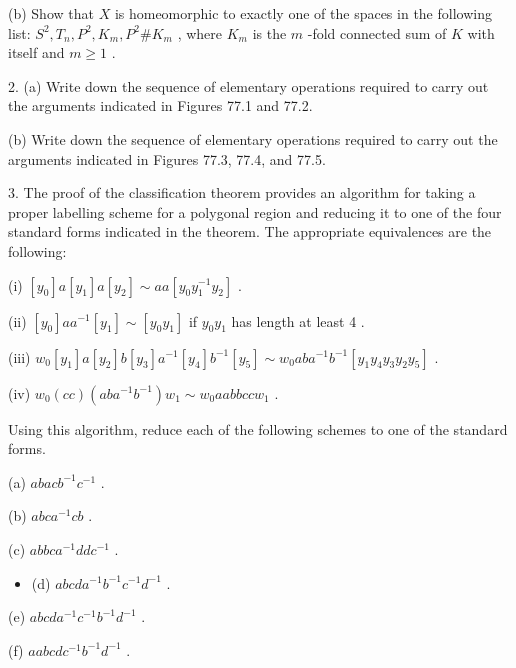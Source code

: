 (b) Show that \(X\) is homeomorphic to exactly one of the spaces in the following list: \({S}^{2},{T}_{n},{P}^{2},{K}_{m},{P}^{2}\# {K}_{m}\) , where \({K}_{m}\) is the \(m\) -fold connected sum of \(K\) with itself and \(m \geq  1\) .

2. (a) Write down the sequence of elementary operations required to carry out the arguments indicated in Figures 77.1 and 77.2.

(b) Write down the sequence of elementary operations required to carry out the arguments indicated in Figures 77.3, 77.4, and 77.5.

3. The proof of the classification theorem provides an algorithm for taking a proper labelling scheme for a polygonal region and reducing it to one of the four standard forms indicated in the theorem. The appropriate equivalences are the following:

(i) \(\left\lbrack  {y}_{0}\right\rbrack  a\left\lbrack  {y}_{1}\right\rbrack  a\left\lbrack  {y}_{2}\right\rbrack \sim  {aa}\left\lbrack  {{y}_{0}{y}_{1}^{-1}{y}_{2}}\right\rbrack\) .

(ii) \(\left\lbrack  {y}_{0}\right\rbrack  a{a}^{-1}\left\lbrack  {y}_{1}\right\rbrack \sim  \left\lbrack  {{y}_{0}{y}_{1}}\right\rbrack\) if \({y}_{0}{y}_{1}\) has length at least 4 .

(iii) \({w}_{0}\left\lbrack  {y}_{1}\right\rbrack  a\left\lbrack  {y}_{2}\right\rbrack  b\left\lbrack  {y}_{3}\right\rbrack  {a}^{-1}\left\lbrack  {y}_{4}\right\rbrack  {b}^{-1}\left\lbrack  {y}_{5}\right\rbrack \sim  {w}_{0}{ab}{a}^{-1}{b}^{-1}\left\lbrack  {{y}_{1}{y}_{4}{y}_{3}{y}_{2}{y}_{5}}\right\rbrack\) .

(iv) \({w}_{0}\left( {cc}\right) \left( {{ab}{a}^{-1}{b}^{-1}}\right) {w}_{1} \sim  {w}_{0}{aabbcc}{w}_{1}\) .

Using this algorithm, reduce each of the following schemes to one of the standard forms.

(a) \({abac}{b}^{-1}{c}^{-1}\) .

(b) \({abc}{a}^{-1}{cb}\) .

(c) \({abbc}{a}^{-1}{dd}{c}^{-1}\) .

\begin{itemize}
\item (d) \({abcd}{a}^{-1}{b}^{-1}{c}^{-1}{d}^{-1}\) .
\end{itemize}

(e) \({abcd}{a}^{-1}{c}^{-1}{b}^{-1}{d}^{-1}\) .

(f) \({aabcd}{c}^{-1}{b}^{-1}{d}^{-1}\) .

